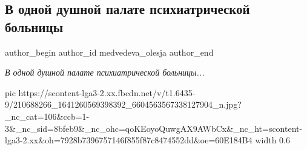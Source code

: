  
 
 
 
 
 
\subsection{В одной душной палате психиатрической больницы}
\label{sec:30_06_2021.fb.medvedeva_olesja.1.psih_bolnica_pobeda_futbol_ukraina}
\ifcmt
 author_begin
   author_id medvedeva_olesja
 author_end
\fi

\begin{center}
\color{blue}
\Large\em
В одной душной палате психиатрической больницы...
\end{center}

\ifcmt
  pic https://scontent-lga3-2.xx.fbcdn.net/v/t1.6435-9/210688266_1641260569398392_6604563567338127904_n.jpg?_nc_cat=106&ccb=1-3&_nc_sid=8bfeb9&_nc_ohc=qoKEoyoQuwgAX9AWbCx&_nc_ht=scontent-lga3-2.xx&oh=7928b7396757146f855f87c8474552dd&oe=60E184B4
  width 0.6
\fi

